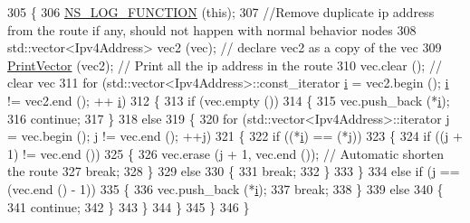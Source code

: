 \begin{DoxyCode}
305 \{
306   \hyperlink{log-macros-disabled_8h_a90b90d5bad1f39cb1b64923ea94c0761}{NS\_LOG\_FUNCTION} (\textcolor{keyword}{this});
307   \textcolor{comment}{//Remove duplicate ip address from the route if any, should not happen with normal behavior nodes}
308   std::vector<Ipv4Address> vec2 (vec); \textcolor{comment}{// declare vec2 as a copy of the vec}
309   \hyperlink{classns3_1_1dsr_1_1DsrOptions_a44ae8e58769880ec9c0150bb28652350}{PrintVector} (vec2); \textcolor{comment}{// Print all the ip address in the route}
310   vec.clear (); \textcolor{comment}{// clear vec}
311   \textcolor{keywordflow}{for} (std::vector<Ipv4Address>::const\_iterator \hyperlink{bernuolliDistribution_8m_a6f6ccfcf58b31cb6412107d9d5281426}{i} = vec2.begin (); \hyperlink{bernuolliDistribution_8m_a6f6ccfcf58b31cb6412107d9d5281426}{i} != vec2.end (); ++
      \hyperlink{bernuolliDistribution_8m_a6f6ccfcf58b31cb6412107d9d5281426}{i})
312     \{
313       \textcolor{keywordflow}{if} (vec.empty ())
314         \{
315           vec.push\_back (*\hyperlink{bernuolliDistribution_8m_a6f6ccfcf58b31cb6412107d9d5281426}{i});
316           \textcolor{keywordflow}{continue};
317         \}
318       \textcolor{keywordflow}{else}
319         \{
320           \textcolor{keywordflow}{for} (std::vector<Ipv4Address>::iterator j = vec.begin (); j != vec.end (); ++j)
321             \{
322               \textcolor{keywordflow}{if} ((*\hyperlink{bernuolliDistribution_8m_a6f6ccfcf58b31cb6412107d9d5281426}{i}) == (*j))
323                 \{
324                   \textcolor{keywordflow}{if} ((j + 1) != vec.end ())
325                     \{
326                       vec.erase (j + 1, vec.end ());   \textcolor{comment}{// Automatic shorten the route}
327                       \textcolor{keywordflow}{break};
328                     \}
329                   \textcolor{keywordflow}{else}
330                     \{
331                       \textcolor{keywordflow}{break};
332                     \}
333                 \}
334               \textcolor{keywordflow}{else} \textcolor{keywordflow}{if} (j == (vec.end () - 1))
335                 \{
336                   vec.push\_back (*\hyperlink{bernuolliDistribution_8m_a6f6ccfcf58b31cb6412107d9d5281426}{i});
337                   \textcolor{keywordflow}{break};
338                 \}
339               \textcolor{keywordflow}{else}
340                 \{
341                   \textcolor{keywordflow}{continue};
342                 \}
343             \}
344         \}
345     \}
346 \}
\end{DoxyCode}



